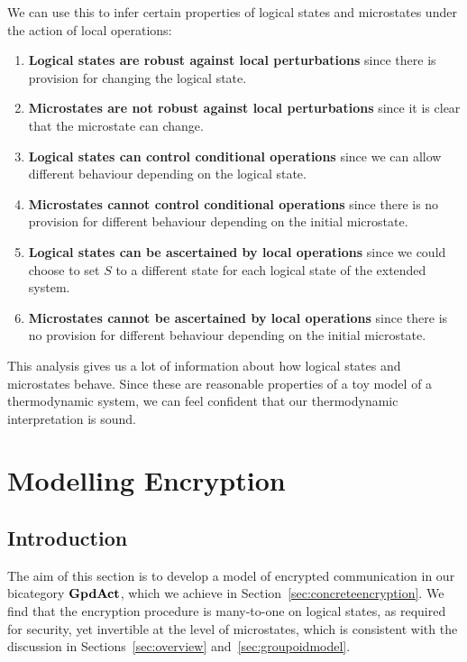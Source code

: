 \documentclass[a4paper,12pt]{article}
\theoremstyle{definition}
\newcommand\cat[1]{{\ensuremath{\bf #1}}}
\renewcommand{\-}[0]{\nobreakdash-\hspace{0pt}}
\begin{document}
We can use this to infer certain properties of logical states and microstates under the action of local operations:
\begin{enumerate}[label=(\arabic*)]
\item \textbf{Logical states are robust against  local perturbations} since there is provision for changing the logical state.

\item \textbf{Microstates are not robust against local perturbations} since it is clear that the microstate can change.

\item \textbf{Logical states can control conditional operations} since we can allow different behaviour depending on the logical state.

\item \textbf{Microstates cannot control conditional operations} since there is no provision for different behaviour depending on the initial microstate.

\item \textbf{Logical states can be ascertained by local operations} since we could choose to set $S$ to a different state for each logical state of the extended system.

\item \textbf{Microstates cannot be ascertained by local operations} since there is no provision for different behaviour depending on the initial microstate.
\end{enumerate}

\noindent
This analysis gives us a lot of information about how logical states and microstates behave. Since these are reasonable properties of a toy model of a thermodynamic system, we can feel confident that our thermodynamic interpretation is sound.


\section{Modelling Encryption}
\label{sec:encryption}

\subsection{Introduction}

\noindent
The aim of this section is to develop a model of encrypted communication in our bicategory \cat{GpdAct}, which we achieve in Section~\ref{sec:concreteencryption}. We find that the encryption procedure is many-to-one on logical states, as required for security, yet invertible at the level of microstates, which is consistent with the discussion in Sections~\ref{sec:overview} and~\ref{sec:groupoidmodel}.
\end{document}
